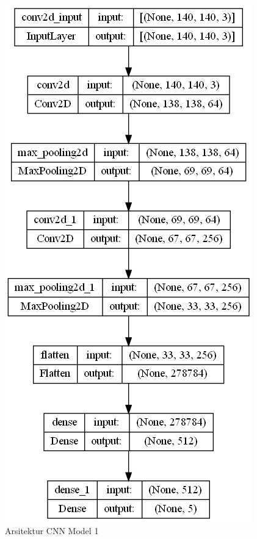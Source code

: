 \begin{figure}[H]
  \centering
  \includegraphics[scale=0.6]{gambar/tabelcnn.png}
  \caption{Arsitektur CNN Model 1}
  \label{fig:Arsitektur CNN Model 1}
\end{figure}

